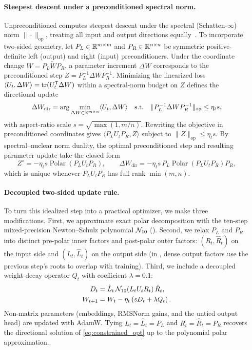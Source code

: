 \paragraph{Steepest descent under a preconditioned spectral norm.}
Unpreconditioned  computes steepest descent under the spectral (Schatten-$\infty$) norm $\|\cdot\|_{\mathrm{op}}$, treating all input and output directions equally~\citep{jordan2024muon}. To incorporate two-sided geometry, let $P_L\in\mathbb{R}^{m\times m}$ and $P_R\in\mathbb{R}^{n\times n}$ be symmetric positive-definite left (output) and right (input) preconditioners. Under the coordinate change $W=P_L\widetilde W P_R$, a parameter increment $\Delta W$ corresponds to the preconditioned step $Z=P_L^{-1}\Delta W P_R^{-1}$. Minimizing the linearized loss $\langle U_t,\Delta W\rangle=\operatorname{tr}(U_t^{{\mathsf{T}}}\Delta W)$ within a spectral-norm budget on $Z$ defines the directional update
\begin{equation}
 \Delta W_{\mathrm{dir}}
 =\arg\min_{\Delta W\in\mathbb{R}^{m\times n}}\langle U_t,\Delta W\rangle
 \quad\text{s.t.}\quad
 \|P_L^{-1}\Delta W P_R^{-1}\|_{\mathrm{op}}\le\eta_t s,
 \label{eq:constrained_opt}
\end{equation}
with aspect-ratio scale $s=\sqrt{\max(1,m/n)}$. Rewriting the objective in preconditioned coordinates gives $\langle P_L U_t P_R,Z\rangle$ subject to $\|Z\|_{\mathrm{op}}\le\eta_t s$. By spectral--nuclear norm duality, the optimal preconditioned step and resulting parameter update take the closed form
\[
 Z^\star=-\eta_t s\operatorname{Polar}(P_L U_t P_R),
 \qquad
 \Delta W_{\mathrm{dir}}=-\eta_t s\,P_L\operatorname{Polar}(P_L U_t P_R)P_R,
\]
which is unique whenever $P_L U_t P_R$ has full rank $\min(m,n)$.

\paragraph{Decoupled two-sided update rule.}
To turn this idealized step into a practical optimizer, we make three modifications. First, we approximate exact polar decomposition with the ten-step mixed-precision Newton--Schulz polynomial $\mathcal{N}_{10}$ (). Second, we relax $P_L$ and $P_R$ into distinct pre-polar inner factors and post-polar outer factors: $(R_t,\hat R_t)$ on the input side and $(L_t,\hat L_t)$ on the output side (in , dense output factors use the previous step's roots to overlap with training). Third, we include a decoupled weight-decay operator $Q_t$ with coefficient $\lambda=0.1$:
\begin{align}
 D_t&=\hat L_t\,\mathcal{N}_{10}\!\left(L_t U_t R_t\right)\hat R_t,\nonumber\\
 W_{t+1}&=W_t-\eta_t\left(s D_t+\lambda Q_t\right).
 \label{eq:update}
\end{align}
Non-matrix parameters (embeddings, RMSNorm gains, and the untied output head) are updated with AdamW. Tying $L_t=\hat L_t=P_L$ and $R_t=\hat R_t=P_R$ recovers the directional solution of \cref{eq:constrained_opt} up to the polynomial polar approximation.

